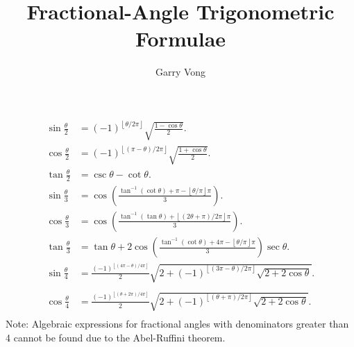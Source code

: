 \documentclass[12pt]{article}
\title{Fractional-Angle Trigonometric Formulae}
\author{Garry Vong}
\date{}
\begin{document}
\maketitle
	\begin{align*}
	 \sin\frac{\theta}{2} &= (-1)^{\textstyle \left \lfloor \theta / 2\pi \right\rfloor} \sqrt{\frac{1- \cos\theta}{2}}.\\	
	 \cos\frac{\theta}{2} &= (-1)^{\textstyle \left \lfloor (\pi -\theta) / 2\pi\right\rfloor} \sqrt{\frac{1+\cos\theta}{2}}.\\
	 \tan\frac{\theta}{2} &= \csc\theta - \cot\theta.	\\
     \sin\frac{\theta}{3} &= \cos\left(\frac{\tan^{-1} \left({\cot\theta}\right) +\pi - \left \lfloor {\theta} /{\pi}\right\rfloor \pi}{3}\right).\\
     \cos\frac{\theta}{3} &= \cos\left(\frac{\tan^{-1} \left({\tan\theta}\right) +\left \lfloor (2\theta+\pi) /{2\pi}\right\rfloor \pi}{3}\right).\\
     \tan\frac{\theta}{3} &= \tan\theta +2\cos\left(\frac{\tan^{-1} \left({\cot\theta}\right) +4\pi - \left \lfloor \theta /{\pi}\right\rfloor \pi}{3}\right)\sec\theta.\\
     \sin\frac{\theta}{4} &= \frac{(-1)^{\textstyle \left \lfloor (4\pi-\theta) / 4\pi \right \rfloor }}{2} {\sqrt{2 +(-1)^{\textstyle\left \lfloor (3\pi-\theta) /{2\pi}  \right \rfloor } \sqrt{2+2\cos\theta}}}.\\	\\
     \cos\frac{\theta}{4} &= \frac{(-1)^{\textstyle \left \lfloor (\theta + 2\pi) / 4\pi \right \rfloor }}{2} {\sqrt{2 +(-1)^{\textstyle\left \lfloor (\theta + \pi) /{2\pi}  \right \rfloor } \sqrt{2+2\cos\theta}}}.\\ 
	 \end{align*}
Note: Algebraic expressions for fractional angles with denominators greater than 4 cannot be found due to the Abel-Ruffini theorem.
\end{document}
